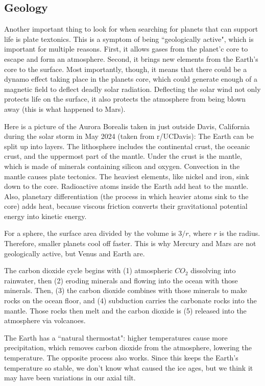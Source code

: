 \documentclass[class=article, crop=false]{standalone}
\begin{document}
\subsection{Geology}
Another important thing to look for when searching for planets that can support life is plate textonics. This is a symptom of being ``geologically active", which is important for multiple reasons. First, it allows gases from the planet'c core to escape and form an atmosphere. Second, it brings new elements from the Earth's core to the surface. Most importantly, though, it means that there could be a dynamo effect taking place in the planets core, which could generate enough of a magnetic field to deflect deadly solar radiation. Deflecting the solar wind not only protects life on the surface, it also protects the atmosphere from being blown away (this is what happened to Mars).
\par
Here is a picture of the Aurora Borealis taken in just outside Davis, California during the solar storm in May 2024 (taken from r/UCDavis):
The Earth can be split up into layers. The lithosphere includes the continental crust, the oceanic crust, and the uppermost part of the mantle. Under the crust is the mantle, which is made of minerals containing silicon and oxygen. Convection in the mantle causes plate tectonics. The heaviest elements, like nickel and iron, sink down to the core. Radioactive atoms inside the Earth add heat to the mantle. Also, planetary differentiation (the process in which heavier atoms sink to the core) adds heat, because viscous friction converts their gravitational potential energy into kinetic energy.
\par
For a sphere, the surface area divided by the volume is $3/r$, where $r$ is the radius. Therefore, smaller planets cool off faster. This is why Mercury and Mars are not geologically active, but Venus and Earth are.
\par
The carbon dioxide cycle begins with (1) atmospheric $CO_2$ dissolving into rainwater, then (2) eroding minerals and flowing into the ocean with those minerals. Then, (3) the carbon dioxide combines with those minerals to make rocks on the ocean floor, and (4) subduction carries the carbonate rocks into the mantle. Those rocks then melt and the carbon dioxide is (5) released into the atmosphere via volcanoes.
\par
The Earth has a ``natural thermostat": higher temperatures cause more precipitation, which removes carbon dioxide from the atmosphere, lowering the temperature. The opposite process also works. Since this keeps the Earth's temperature so stable, we don't know what caused the ice ages, but we think it may have been variations in our axial tilt.
\end{document}
